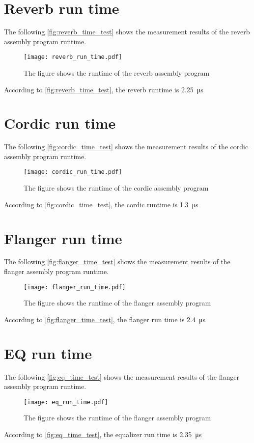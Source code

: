 \section*{Reverb run time}
The following \autoref{fig:reverb_time_test} shows the measurement results of the \gls{reverb} assembly program runtime.
\begin{figure}[htbp!]
	\centering
		\texttt{[image: reverb\_run\_time.pdf]}
		\caption{The figure shows the runtime of the \gls{reverb} assembly program}
		\label{fig:reverb_time_test}
\end{figure}

According to \autoref{fig:reverb_time_test}, the \gls{reverb} runtime is \SI{2.25}{\micro\second}

\section*{Cordic run time}
The following \autoref{fig:cordic_time_test} shows the measurement results of the cordic assembly program runtime.
\begin{figure}[htbp!]
	\centering
		\texttt{[image: cordic\_run\_time.pdf]}
		\caption{The figure shows the runtime of the cordic assembly program}
		\label{fig:cordic_time_test}
\end{figure}

According to \autoref{fig:cordic_time_test}, the cordic runtime is \SI{1.3}{\micro\second}

\section*{Flanger run time}
The following \autoref{fig:flanger_time_test} shows the measurement results of the flanger assembly program runtime.
\begin{figure}[htbp!]
	\centering
		\texttt{[image: flanger\_run\_time.pdf]}
		\caption{The figure shows the runtime of the flanger assembly program}
		\label{fig:flanger_time_test}
\end{figure}

According to \autoref{fig:flanger_time_test}, the flanger run time is \SI{2.4}{\micro\second}

\section*{EQ run time}
The following \autoref{fig:eq_time_test} shows the measurement results of the flanger assembly program runtime.
\begin{figure}[htbp!]
	\centering
		\texttt{[image: eq\_run\_time.pdf]}
		\caption{The figure shows the runtime of the flanger assembly program}
		\label{fig:eq_time_test}
\end{figure}

According to \autoref{fig:eq_time_test}, the equalizer run time is \SI{2.35}{\micro\second}